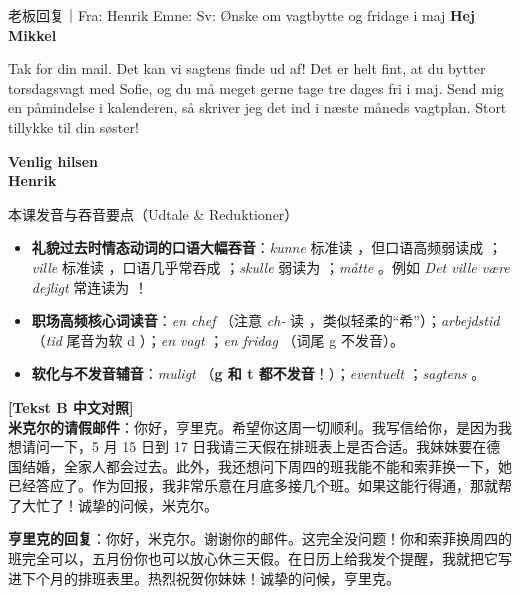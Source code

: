 \begin{emailbox}{老板回复｜Fra: Henrik \quad Emne: Sv: Ønske om vagtbytte og fridage i maj}
\textbf{Hej Mikkel}

Tak for din mail. Det kan vi sagtens finde ud af! Det er helt fint, at du bytter torsdagsvagt med Sofie, og du må meget gerne tage tre dages fri i maj. Send mig en påmindelse i kalenderen, så skriver jeg det ind i næste måneds vagtplan. Stort tillykke til din søster!

\textbf{Venlig hilsen}\\
\textbf{Henrik}
\end{emailbox}

\begin{tipbox}{本课发音与吞音要点（Udtale \& Reduktioner）}
\begin{itemize}
  \item \textbf{礼貌过去时情态动词的口语大幅吞音}：\textit{kunne} 标准读 ，但口语高频弱读成 ；\textit{ville} 标准读 ，口语几乎常吞成 ；\textit{skulle} 弱读为 ；\textit{måtte} 。例如 \textit{Det ville være dejligt} 常连读为 ！
  \item \textbf{职场高频核心词读音}：\textit{en chef} （注意 \textit{ch-} 读 ，类似轻柔的“希”）；\textit{arbejdstid} （\textit{tid} 尾音为软 d ）；\textit{en vagt} ；\textit{en fridag} （词尾 g 不发音）。
  \item \textbf{软化与不发音辅音}：\textit{muligt} （\textbf{g 和 t 都不发音}！）；\textit{eventuelt} ；\textit{sagtens} 。
\end{itemize}
\end{tipbox}

\begin{transbox}
\small
\textbf{\color{NCDTeal}[Tekst B 中文对照]}\\
\textbf{米克尔的请假邮件}：你好，亨里克。希望你这周一切顺利。我写信给你，是因为我想请问一下，5 月 15 日到 17 日我请三天假在排班表上是否合适。我妹妹要在德国结婚，全家人都会过去。此外，我还想问下周四的班我能不能和索菲换一下，她已经答应了。作为回报，我非常乐意在月底多接几个班。如果这能行得通，那就帮了大忙了！诚挚的问候，米克尔。

\textbf{亨里克的回复}：你好，米克尔。谢谢你的邮件。这完全没问题！你和索菲换周四的班完全可以，五月份你也可以放心休三天假。在日历上给我发个提醒，我就把它写进下个月的排班表里。热烈祝贺你妹妹！诚挚的问候，亨里克。
\end{transbox}


